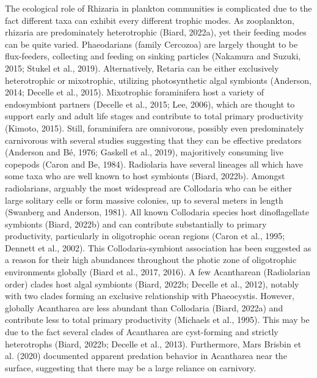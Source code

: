 \documentclass[
]{article}
\begin{document}
The ecological role of Rhizaria in plankton communities is complicated
due to the fact different taxa can exhibit every different trophic
modes. As zooplankton, rhizaria are predominately heterotrophic (Biard,
2022a), yet their feeding modes can be quite varied. Phaeodarians
(family Cercozoa) are largely thought to be flux-feeders, collecting and
feeding on sinking particles (Nakamura and Suzuki, 2015; Stukel et al.,
2019). Alternatively, Retaria can be either exclusively heterotrophic or
mixotrophic, utilizing photosynthetic algal symbionts (Anderson, 2014;
Decelle et al., 2015). Mixotrophic foraminifera host a variety of
endosymbiont partners (Decelle et al., 2015; Lee, 2006), which are
thought to support early and adult life stages and contribute to total
primary productivity (Kimoto, 2015). Still, foraminifera are omnivorous,
possibly even predominately carnivorous with several studies suggesting
that they can be effective predators (Anderson and Bé, 1976; Gaskell et
al., 2019), majoritively consuming live copepods (Caron and Be, 1984).
Radiolaria have several lineages all which have some taxa who are well
known to host symbionts (Biard, 2022b). Amongst radiolarians, arguably
the most widespread are Collodaria who can be either large solitary
cells or form massive colonies, up to several meters in length (Swanberg
and Anderson, 1981). All known Collodaria species host dinoflagellate
symbionts (Biard, 2022b) and can contribute substantially to primary
productivity, particularly in oligotrophic ocean regions (Caron et al.,
1995; Dennett et al., 2002). This Collodaria-symbiont association has
been suggested as a reason for their high abundances throughout the
photic zone of oligotrophic environments globally (Biard et al., 2017,
2016). A few Acantharean (Radiolarian order) clades host algal symbionts
(Biard, 2022b; Decelle et al., 2012), notably with two clades forming an
exclusive relationship with Phaeocystis. However, globally Acantharea
are less abundant than Collodaria (Biard, 2022a) and contribute less to
total primary productivity (Michaels et al., 1995). This may be due to
the fact several clades of Acantharea are cyst-forming and strictly
heterotrophs (Biard, 2022b; Decelle et al., 2013). Furthermore, Mars
Brisbin et al. (2020) documented apparent predation behavior in
Acantharea near the surface, suggesting that there may be a large
reliance on carnivory.
\end{document}
